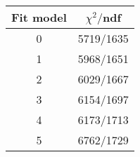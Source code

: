 \begin{tabular}{c|c}
Fit model & $\chi^2/$ndf \\
\hline
0 & 5719/1635\\
1 & 5968/1651\\
2 & 6029/1667\\
3 & 6154/1697\\
4 & 6173/1713\\
5 & 6762/1729\\
\end{tabular}
